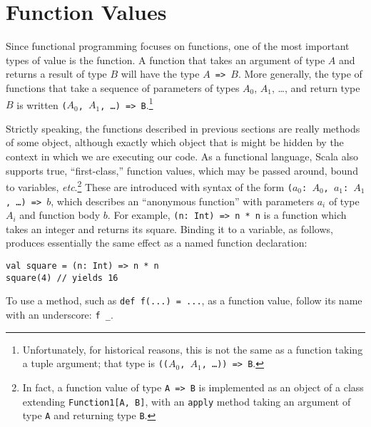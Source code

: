 \section{Function Values}\label{sec:fval}
Since functional programming focuses on functions, one of the most important types of value is the function. A function that takes an argument of type $A$ and returns a result of type $B$ will have the type \texttt{$A$ => $B$}. More generally, the type of functions that take a sequence of parameters of types $A_0$, $A_1$, \ldots, and return type $B$ is written \texttt{($A_0$, $A_1$, \ldots)\ => B}.\footnote{Unfortunately, for historical reasons, this is not the same as a function taking a tuple argument; that type is \texttt{(($A_0$, $A_1$, \ldots))\ => B}.}

Strictly speaking, the functions described in previous sections are really methods of some object, although exactly which object that is might be hidden by the context in which we are executing our code. As a functional language, Scala also supports true, ``first-class,'' function values, which may be passed around, bound to variables, \textit{etc}.\footnote{In fact, a function value of type \texttt{A => B} is implemented as an object of a class extending \texttt{Function1[A, B]}, with an \texttt{apply} method taking an argument of type \texttt{A} and returning type \texttt{B}.} These are introduced with syntax of the form \texttt{($a_0$:\ $A_0$, $a_1$:\ $A_1$, \ldots)\ => $b$}, which describes an ``anonymous function'' with parameters $a_i$ of type $A_i$ and function body $b$. For example, \texttt{(n:\ Int)\ => n * n} is a function which takes an integer and returns its square. Binding it to a variable, as follows, produces essentially the same effect as a named function declaration:
\begin{verbatim}
val square = (n: Int) => n * n
square(4) // yields 16
\end{verbatim}
To use a method, such as \verb|def f(...) = ...|, as a function value, follow its name with an underscore: \verb|f _|.

